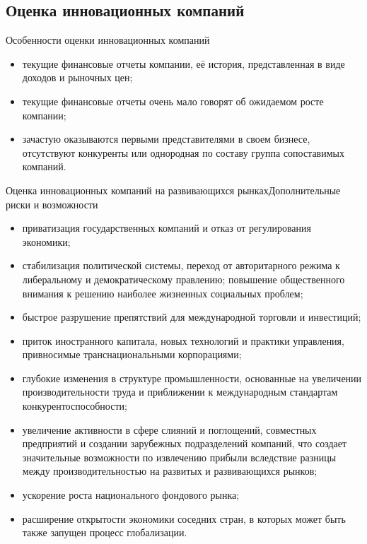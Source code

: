 \documentclass[_Venture_p2.tex]{subfiles}
\begin{document}

\subsection{Оценка инновационных компаний}
\begin{frame}{Особенности оценки инновационных компаний}{}
\begin{itemize}
	\item текущие финансовые отчеты компании, её история, представленная в виде доходов и рыночных цен;
	\item текущие финансовые отчеты очень мало говорят об ожидаемом росте компании;
	\item зачастую оказываются первыми представителями в своем бизнесе, отсутствуют конкуренты или однородная по составу группа сопоставимых компаний.
\end{itemize}
\end{frame}

\begin{frame}[allowframebreaks]{Оценка инновационных компаний на развивающихся рынках}{Дополнительные риски и возможности}
\begin{itemize}
	\item приватизация государственных компаний и отказ от регулирования экономики;
	\item стабилизация политической системы, переход от авторитарного режима к либеральному и демократическому правлению; повышение общественного внимания к решению наиболее жизненных социальных проблем;
	
	\pagebreak
	\item быстрое разрушение препятствий для международной торговли и инвестиций;
	\item приток иностранного капитала, новых технологий и практики управления, привносимые транснациональными корпорациями;

	\pagebreak
	\item глубокие изменения в структуре промышленности, основанные на увеличении производительности труда и приближении к международным стандартам конкурентоспособности;
	\item увеличение активности в сфере слияний и поглощений, совместных предприятий и создании зарубежных подразделений компаний, что создает значительные возможности по извлечению прибыли вследствие разницы между производительностью на развитых и развивающихся рынков;
	\pagebreak
	\item ускорение роста национального фондового рынка;
	\item расширение открытости экономики соседних стран, в которых может быть также запущен процесс глобализации.
\end{itemize}
\end{frame}
\end{document}
